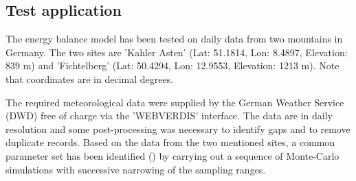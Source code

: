 
\subsection{Test application} \label{sec:snow-enBal_test}

The energy balance model has been tested on daily data from two mountains in Germany. The two sites are 'Kahler Asten' (Lat: 51.1814, Lon: 8.4897, Elevation: 839 m) and 'Fichtelberg' (Lat: 50.4294, Lon: 12.9553, Elevation: 1213 m). Note that coordinates are in decimal degrees.

The required meteorological data were supplied by the German Weather Service (DWD) free of charge via the 'WEBVERDIS' interface. The data are in daily resolution and some post-processing was necessary to identify gaps and to remove duplicate records. Based on the data from the two mentioned sites, a common parameter set has been identified () by carrying out a sequence of Monte-Carlo simulations with successive narrowing of the sampling ranges.

